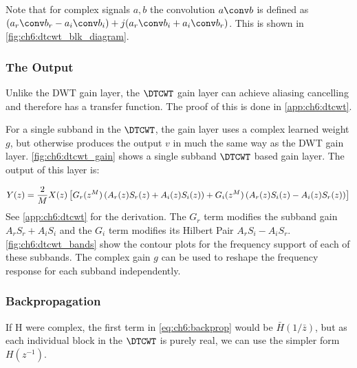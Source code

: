 Note that for complex signals $a, b$ the convolution $a \conv b$ is defined as $(a_r \conv
b_r - a_i \conv b_i) + j(a_r \conv b_i + a_i \conv b_r)$. This is shown 
in \autoref{fig:ch6:dtcwt_blk_diagram}.

\subsubsection{The Output}
Unlike the DWT gain layer, the $\DTCWT$ gain layer can achieve aliasing
cancelling and therefore has a transfer function. The proof of this is done in
\autoref{app:ch6:dtcwt}. 

\begin{figure}[ht!]
  \centering
  
  \label{fig:ch6:dtcwt_gain}
\end{figure}

For a single subband in the $\DTCWT$, the gain layer uses a complex learned
weight $g$, but otherwise produces the output $v$ in much the same way as the
DWT gain layer. \autoref{fig:ch6:dtcwt_gain} shows a single subband $\DTCWT$
based gain layer. The output of this layer is:

\begin{equation}\label{eq:ch6:dtcwt_fwd}
  Y(z) = \frac{2}{M}X(z) \left[G_r(z^{M}) \left(A_r(z)S_r(z) + A_i(z)S_i(z)\right)
  + G_i(z^{M}) \left(A_r(z)S_i(z) - A_i(z)S_r(z)\right) \right] \\
\end{equation}
See \autoref{app:ch6:dtcwt} for the derivation. The $G_r$ term modifies the
subband gain $A_rS_r + A_iS_i$ and the $G_i$ term modifies its Hilbert Pair
$A_rS_i - A_iS_r$. \autoref{fig:ch6:dtcwt_bands} show the contour plots for the
frequency support of each of these subbands. The complex gain $g$ can be used to
reshape the frequency response for each subband independently.

\subsubsection{Backpropagation}\label{sec:ch6:dtcwt_update}
If H were complex, the first term in \autoref{eq:ch6:backprop} would be
$\bar{H}(1/\bar{z})$, but as each individual block in the $\DTCWT$ is purely
real, we can use the simpler form $H(z^{-1})$. 

